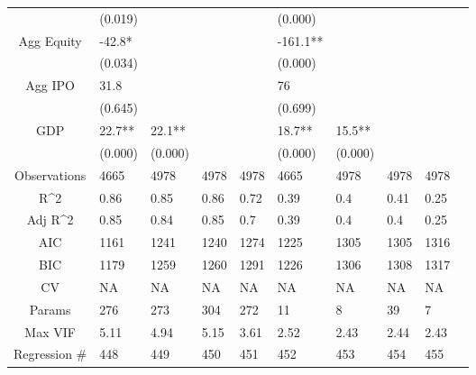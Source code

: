 \documentclass{article}
\begin{document}
\begin{table}[H]
\begin{tabular}{|clllllllll|}
   & (0.019) &  &  &  & (0.000) &  &  &  & \\ 
  Agg Equity & -42.8* &  &  &  & -161.1** &  &  &  & \\ 
   & (0.034) &  &  &  & (0.000) &  &  &  & \\ 
  Agg IPO & 31.8 &  &  &  & 76 &  &  &  & \\ 
   & (0.645) &  &  &  & (0.699) &  &  &  & \\ 
  GDP & 22.7** & 22.1** &  &  & 18.7** & 15.5** &  &  & \\ 
   & (0.000) & (0.000) &  &  & (0.000) & (0.000) &  &  & \\ 
  \hline 
 Observations & 4665 & 4978 & 4978 & 4978 & 4665 & 4978 & 4978 & 4978 & \\ 
  R^2 & 0.86 & 0.85 & 0.86 & 0.72 & 0.39 & 0.4 & 0.41 & 0.25 & \\ 
  Adj R^2 & 0.85 & 0.84 & 0.85 & 0.7 & 0.39 & 0.4 & 0.4 & 0.25 & \\ 
  AIC & 1161 & 1241 & 1240 & 1274 & 1225 & 1305 & 1305 & 1316 & \\ 
  BIC & 1179 & 1259 & 1260 & 1291 & 1226 & 1306 & 1308 & 1317 & \\ 
  CV & NA & NA & NA & NA & NA & NA & NA & NA & \\ 
  Params & 276 & 273 & 304 & 272 & 11 & 8 & 39 & 7 & \\ 
  Max VIF & 5.11 & 4.94 & 5.15 & 3.61 & 2.52 & 2.43 & 2.44 & 2.43 & \\ 
  Regression \# & 448 & 449 & 450 & 451 & 452 & 453 & 454 & 455 & \\ 
   \hline
\end{tabular}
 
\end{table}
\end{document}
